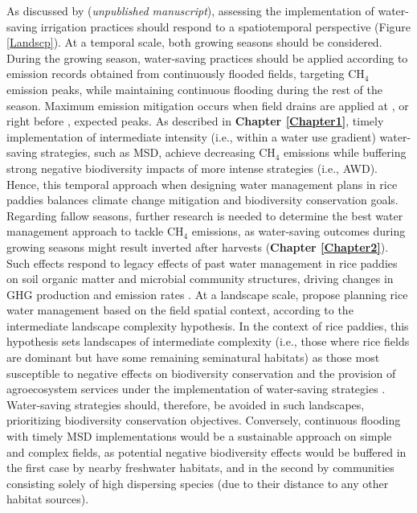 As discussed by \cite{perez-mendez2025a} (\textit{unpublished manuscript}), assessing the implementation of water-saving irrigation practices should respond to a spatiotemporal perspective (Figure \ref{Landscp}). At a temporal scale, both growing seasons should be considered. During the growing season, water-saving practices should be applied according to emission records obtained from continuously flooded fields, targeting CH$_{4}$ emission peaks, while maintaining continuous flooding during the rest of the season.  Maximum emission mitigation occurs when field drains are applied at \citep{fertitta-roberts2019}, or right before \citep{souza2021}, expected peaks. As described in \textbf{Chapter \ref{Chapter1}}, timely implementation of intermediate intensity (i.e., within a water use gradient) water-saving strategies, such as MSD, achieve decreasing CH$_{4}$ emissions while buffering strong negative biodiversity impacts of more intense strategies (i.e., AWD). Hence, this temporal approach when designing water management plans in rice paddies balances climate change mitigation and biodiversity conservation goals. Regarding fallow seasons, further research is needed to determine the best water management approach to tackle CH$_{4}$ emissions, as water-saving outcomes during growing seasons might result inverted after harvests (\textbf{Chapter \ref{Chapter2}}). Such effects respond to legacy effects of past water management in rice paddies on soil organic matter and microbial community structures, driving changes in GHG production and emission rates \citep{shao2017, tian2022}.  %
At a landscape scale, \cite{perez-mendez2025a} propose planning rice water management based on the field spatial context, according to the intermediate landscape complexity hypothesis. In the context of rice paddies, this hypothesis sets landscapes of intermediate complexity (i.e., those where rice fields are dominant but have some remaining seminatural habitats) as those most susceptible to negative effects on biodiversity conservation and the provision of agroecosystem services under the implementation of water-saving strategies \citep{tscharntke2005landscape, bommarco2013ecological, grab2018}. Water-saving strategies should, therefore, be avoided in such landscapes, prioritizing biodiversity conservation objectives. Conversely, continuous flooding with timely MSD implementations would be a sustainable approach on simple and complex fields, as potential negative biodiversity effects would be buffered in the first case by nearby freshwater habitats, and in the second by communities consisting solely of high dispersing species (due to their distance to any other habitat sources).\\

